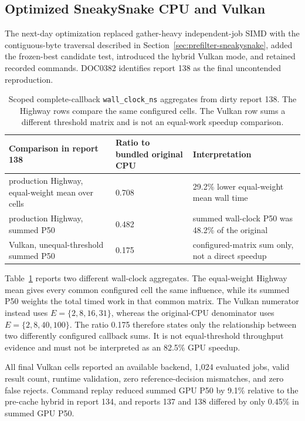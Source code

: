 \subsection{Optimized SneakySnake CPU and Vulkan}

The next-day optimization replaced gather-heavy independent-job SIMD with the
contiguous-byte traversal described in
Section~\ref{sec:prefilter-sneakysnake}, added the frozen-best candidate test,
introduced the hybrid Vulkan mode, and retained recorded commands.
DOC0382 identifies report 138 as the final uncontended reproduction.

\begin{table}[htbp]
\centering
\small
\caption{Scoped complete-callback \texttt{wall\_clock\_ns} aggregates from
dirty report 138. The Highway rows compare the same configured cells. The
Vulkan row sums a different threshold matrix and is not an equal-work speedup
comparison.}
\label{tab:sneakysnake-report138}
\begin{tabular}{p{}p{}p{}}
\textbf{Comparison in report 138} & \textbf{Ratio to bundled original CPU} &
\textbf{Interpretation}\\
\hline
production Highway, equal-weight mean over cells & 0.708 &
29.2\% lower equal-weight mean wall time\\
production Highway, summed P50 & 0.482 &
summed wall-clock P50 was 48.2\% of the original\\
Vulkan, unequal-threshold summed P50 & 0.175 &
configured-matrix sum only, not a direct speedup\\
\end{tabular}
\end{table}

Table~\ref{tab:sneakysnake-report138} reports two different wall-clock
aggregates. The equal-weight Highway mean gives every common configured cell
the same influence, while its summed P50 weights the total timed work in that
common matrix.  The Vulkan numerator instead uses
\(E=\{2,8,16,31\}\), whereas the original-CPU denominator uses
\(E=\{2,8,40,100\}\).  The ratio 0.175 therefore states only the relationship
between two differently configured callback sums.  It is not equal-threshold
throughput evidence and must not be interpreted as an 82.5\% GPU speedup.

All final Vulkan cells reported an available backend, 1,024 evaluated jobs,
valid result count, runtime validation, zero reference-decision mismatches, and
zero false rejects.  Command replay reduced summed GPU P50 by 9.1\% relative to
the pre-cache hybrid in report 134, and reports 137 and 138 differed by only
0.45\% in summed GPU P50.

